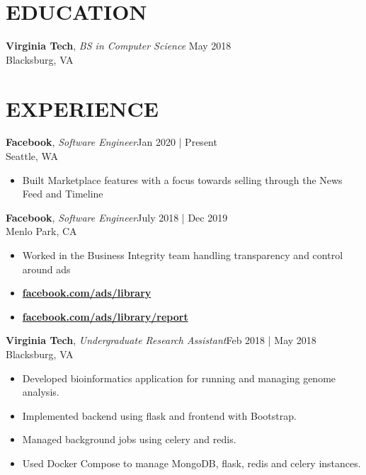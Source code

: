 \documentclass[line,margin]{res}
\begin{document}
\address{vinnyoodles@gmail.com | \textbf{\href{https://github.com/vinnyoodles}{github.com/vinnyoodles}}}
\begin{resume}
	\vspace{-5mm}
	\section{EDUCATION}
		\textbf{Virginia Tech}, {\sl BS in Computer Science} \hfill May 2018\\Blacksburg, VA

	\section{EXPERIENCE}
		\textbf{Facebook}, {\sl Software Engineer}\hfill Jan 2020 | Present\\Seattle, WA\\
		\begin{itemize} \itemsep 1pt
			\item Built Marketplace features with a focus towards selling through the News Feed and Timeline
		\end{itemize}
		\textbf{Facebook}, {\sl Software Engineer}\hfill July 2018 | Dec 2019\\Menlo Park, CA\\
		\begin{itemize} \itemsep 1pt
			\item Worked in the Business Integrity team handling transparency and control around ads
			\item \textbf{\href{https://facebook.com/ads/library}{facebook.com/ads/library}}
			\item \textbf{\href{https://facebook.com/ads/library/report}{facebook.com/ads/library/report}}
		\end{itemize}
		\textbf{Virginia Tech}, {\sl Undergraduate Research Assistant}\hfill Feb 2018 | May 2018\\Blacksburg, VA\\
		\begin{itemize} \itemsep 1pt
			\item Developed bioinformatics application for running and managing genome analysis.
			\item Implemented backend using flask and frontend with Bootstrap.
			\item Managed background jobs using celery and redis.
			\item Used Docker Compose to manage MongoDB, flask, redis and celery instances.
		\end{itemize}


\end{resume}
\end{document}
